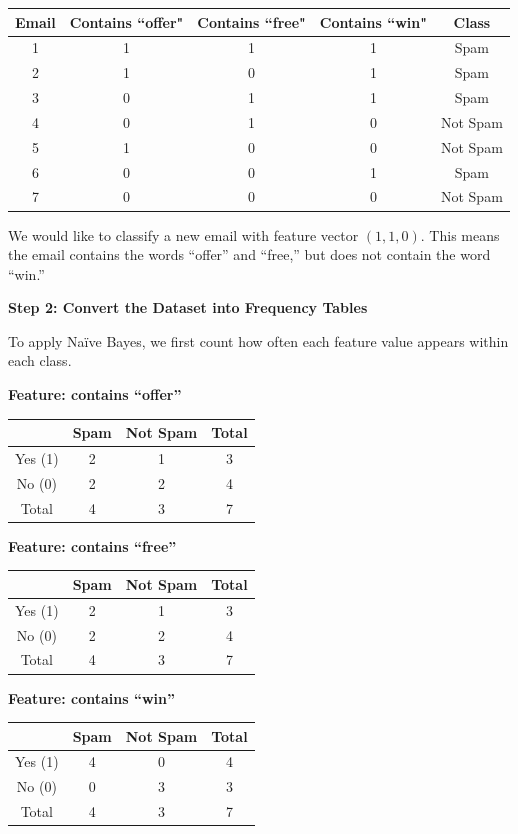 \documentclass{article}
\begin{document}
\begin{center}
\begin{tabular}{|c|c|c|c|c|}
\hline
\textbf{Email} & \textbf{Contains ``offer"} & \textbf{Contains ``free"} & \textbf{Contains ``win"} & \textbf{Class} \\
\hline
1 & 1 & 1 & 1 & Spam \\
2 & 1 & 0 & 1 & Spam \\
3 & 0 & 1 & 1 & Spam \\
4 & 0 & 1 & 0 & Not Spam \\
5 & 1 & 0 & 0 & Not Spam \\
6 & 0 & 0 & 1 & Spam \\
7 & 0 & 0 & 0 & Not Spam \\
\hline
\end{tabular}
\end{center}

We would like to classify a new email with feature vector \( (1,1,0) \). This means the email contains the words ``offer'' and ``free,'' but does not contain the word ``win.''

\noindent \textbf{Step 2: Convert the Dataset into Frequency Tables}

To apply Na\"ive Bayes, we first count how often each feature value appears within each class.

\medskip
\noindent \textbf{Feature: contains ``offer''}
\begin{center}
\begin{tabular}{|c|cc|c|}
\hline
 & Spam & Not Spam & Total \\
\hline
Yes (1) & 2 & 1 & 3 \\
No (0) & 2 & 2 & 4 \\
\hline
Total & 4 & 3 & 7 \\
\hline
\end{tabular}
\end{center}

\noindent \textbf{Feature: contains ``free''}
\begin{center}
\begin{tabular}{|c|cc|c|}
\hline
 & Spam & Not Spam & Total \\
\hline
Yes (1) & 2 & 1 & 3 \\
No (0) & 2 & 2 & 4 \\
\hline
Total & 4 & 3 & 7 \\
\hline
\end{tabular}
\end{center}

\noindent \textbf{Feature: contains ``win''}
\begin{center}
\begin{tabular}{|c|cc|c|}
\hline
 & Spam & Not Spam & Total \\
\hline
Yes (1) & 4 & 0 & 4 \\
No (0) & 0 & 3 & 3 \\
\hline
Total & 4 & 3 & 7 \\
\hline
\end{tabular}
\end{center}
\end{document}
